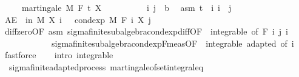 \begin{isabellebody}
\ \ \ \ \ {\isachardoublequoteopen}martingale\ M\ F\ t\ X{\isachardoublequoteclose}\isanewline
%
\isadelimproof
%
\endisadelimproof
%
\isatagproof
{}\isamarkupfalse%
\ \isanewline
\ \ \isacommand{{\isacharbraceleft}{\kern0pt}}\isamarkupfalse%
\isanewline
\ \ \ \ \isamarkupfalse%
\ i\ j\ {\isacharcolon}{\kern0pt}{\isacharcolon}{\kern0pt}\ {\isacharprime}{\kern0pt}b\ \isamarkupfalse%
\ asm{\isacharcolon}{\kern0pt}\ {\isachardoublequoteopen}t\ {\isasymle}\ i{\isachardoublequoteclose}\ {\isachardoublequoteopen}i\ {\isasymle}\ j{\isachardoublequoteclose}\isanewline
\ \ \ \ \isamarkupfalse%
\ {\isachardoublequoteopen}AE\ {\isasymxi}\ in\ M{\isachardot}{\kern0pt}\ X\ i\ {\isasymxi}\ {\isacharequal}{\kern0pt}\ cond{\isacharunderscore}{\kern0pt}exp\ M\ {\isacharparenleft}{\kern0pt}F\ i{\isacharparenright}{\kern0pt}\ {\isacharparenleft}{\kern0pt}X\ j{\isacharparenright}{\kern0pt}\ {\isasymxi}{\isachardoublequoteclose}\ \isanewline
\ \ \ \ \ \ \isamarkupfalse%
\ diff{\isacharunderscore}{\kern0pt}zero{\isacharbrackleft}{\kern0pt}OF\ asm{\isacharbrackright}{\kern0pt}\ sigma{\isacharunderscore}{\kern0pt}finite{\isacharunderscore}{\kern0pt}subalgebra{\isachardot}{\kern0pt}cond{\isacharunderscore}{\kern0pt}exp{\isacharunderscore}{\kern0pt}diff{\isacharbrackleft}{\kern0pt}OF\ {\isacharunderscore}{\kern0pt}\ integrable{\isacharparenleft}{\kern0pt}{}{\isacharcomma}{\kern0pt}{}{\isacharparenright}{\kern0pt}{\isacharcomma}{\kern0pt}\ of\ {\isachardoublequoteopen}F\ i{\isachardoublequoteclose}\ j\ i{\isacharbrackright}{\kern0pt}\ \isanewline
\ \ \ \ \ \ \ \ \ \ \ \ sigma{\isacharunderscore}{\kern0pt}finite{\isacharunderscore}{\kern0pt}subalgebra{\isachardot}{\kern0pt}cond{\isacharunderscore}{\kern0pt}exp{\isacharunderscore}{\kern0pt}F{\isacharunderscore}{\kern0pt}meas{\isacharbrackleft}{\kern0pt}OF\ {\isacharunderscore}{\kern0pt}\ integrable\ adapted{\isacharcomma}{\kern0pt}\ of\ i{\isacharbrackright}{\kern0pt}\ \isamarkupfalse%
\ fastforce\isanewline
\ \ \isacommand{{\isacharbraceright}{\kern0pt}}\isamarkupfalse%
\isanewline
{}\isamarkupfalse%
\ {\isacharparenleft}{\kern0pt}intro\ integrable{\isacharparenright}{\kern0pt}%
\endisatagproof
{\isafoldproof}%
%
\isadelimproof
\isanewline
%
\endisadelimproof
\isanewline
{}\isamarkupfalse%
\ {\isacharparenleft}{\kern0pt}\ sigma{\isacharunderscore}{\kern0pt}finite{\isacharunderscore}{\kern0pt}adapted{\isacharunderscore}{\kern0pt}process{\isacharparenright}{\kern0pt}\ martingale{\isacharunderscore}{\kern0pt}of{\isacharunderscore}{\kern0pt}set{\isacharunderscore}{\kern0pt}integral{\isacharunderscore}{\kern0pt}eq{\isacharcolon}{\kern0pt}\isanewline

\end{isabellebody}

